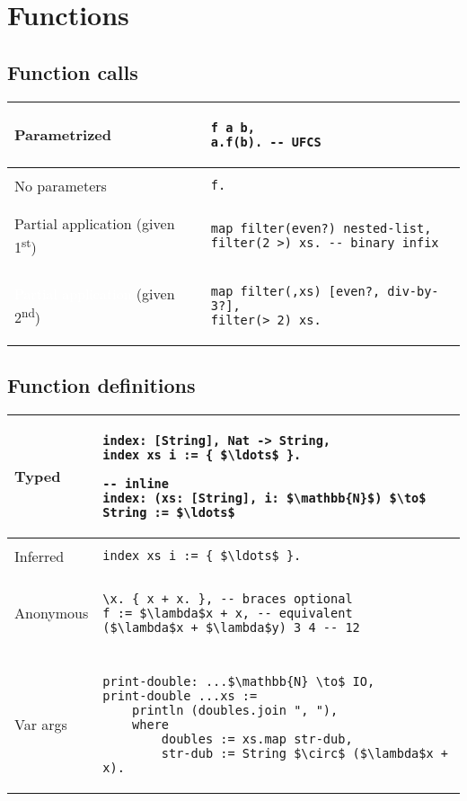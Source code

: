 \documentclass[a4paper,12pt]{article}
\makeatletter
\newcommand{\code}{\lstinline}
\newcommand{\br}{\\ [0.5em] \hline \\ [-0.5em]}
\newenvironment{data}
    {
        \begin{center}
        \begin{tabular*}{\textwidth}{ l@{\extracolsep{\fill}}l }
    }
    {
        \end{tabular*}
        \end{center}
    }
\makeatother
\begin{document}
\section{Functions}
\subsection{Function calls}
\begin{data}
    Parametrized  &
        \begin{lstlisting}
f a b,
a.f(b). -- UFCS
        \end{lstlisting} \br
    No parameters &
        \code|f.|     \br
    Partial application (given 1\textsuperscript{st}) &
        \begin{lstlisting}
map filter(even?) nested-list,
filter(2 >) xs. -- binary infix
        \end{lstlisting} \\
    \textcolor{white}{
    Partial application} (given 2\textsuperscript{nd}) &
        \begin{lstlisting}
map filter(,xs) [even?, div-by-3?],
filter(> 2) xs.
        \end{lstlisting}
\end{data}

\subsection{Function definitions}
\begin{data}
    Typed &
        \begin{lstlisting}[mathescape=true]
index: [String], Nat -> String,
index xs i := { $\ldots$ }.

-- inline
index: (xs: [String], i: $\mathbb{N}$) $\to$ String := $\ldots$
        \end{lstlisting} \br
    Inferred &
        \code[mathescape=true]|index xs i := { $\ldots$ }.|\br
    Anonymous &
        \begin{lstlisting}[mathescape=true]
\x. { x + x. }, -- braces optional
f := $\lambda$x + x, -- equivalent
($\lambda$x + $\lambda$y) 3 4 -- 12
        \end{lstlisting} \br
    Var args &
        \begin{lstlisting}[mathescape=true]
print-double: ...$\mathbb{N} \to$ IO,
print-double ...xs := 
    println (doubles.join ", "),
    where 
        doubles := xs.map str-dub,
        str-dub := String $\circ$ ($\lambda$x + x).
        \end{lstlisting}
\end{data}
\end{document}
